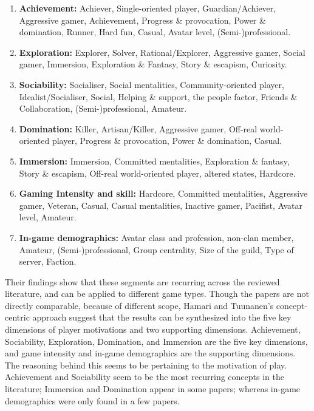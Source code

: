 \documentclass[../Main.tex]{subfiles}
\begin{document}
\begin{enumerate}
    \item \textbf{Achievement:} Achiever, Single-oriented player, Guardian/Achiever, Aggressive gamer, Achievement, Progress \& provocation, Power \& domination, Runner, Hard fun, Casual, Avatar level, (Semi-)professional.
    
    \item \textbf{Exploration:} Explorer, Solver, Rational/Explorer, Aggressive gamer, Social gamer, Immersion, Exploration \& Fantasy, Story \& escapism, Curiosity.
    
    \item \textbf{Sociability:} Socialiser, Social mentalities, Community-oriented player, Idealist/Socialiser, Social, Helping \& support, the people factor, Friends \& Collaboration, (Semi-)professional, Amateur.
    
    \item \textbf{Domination:} Killer, Artisan/Killer, Aggressive gamer, Off-real world-oriented player, Progress \& provocation, Power \& domination, Casual.
    
    \item \textbf{Immersion:} Immersion, Committed mentalities, Exploration \& fantasy, Story \& escapism, Off-real world-oriented player, altered states, Hardcore.
    
    \item \textbf{Gaming Intensity and skill:} Hardcore, Committed mentalities, Aggressive gamer, Veteran, Casual, Casual mentalities, Inactive gamer, Pacifist, Avatar level, Amateur.
    
    \item \textbf{In-game demographics:} Avatar class and profession, non-clan member, Amateur, (Semi-)professional, Group centrality, Size of the guild, Type of server, Faction.
\end{enumerate}

Their findings show that these segments are recurring across the reviewed literature, and can be applied to different game types. Though the papers are not directly comparable, because of different scope, Hamari and Tuunanen’s concept-centric approach suggest that the results can be synthesized into the five key dimensions of player motivations and two supporting dimensions. Achievement, Sociability, Exploration, Domination, and Immersion are the five key dimensions, and game intensity and in-game demographics are the supporting dimensions. The reasoning behind this seems to be pertaining to the motivation of play. Achievement and Sociability seem to be the most recurring concepts in the literature; Immersion and Domination appear in some papers; whereas in-game demographics were only found in a few papers.
\end{document}
